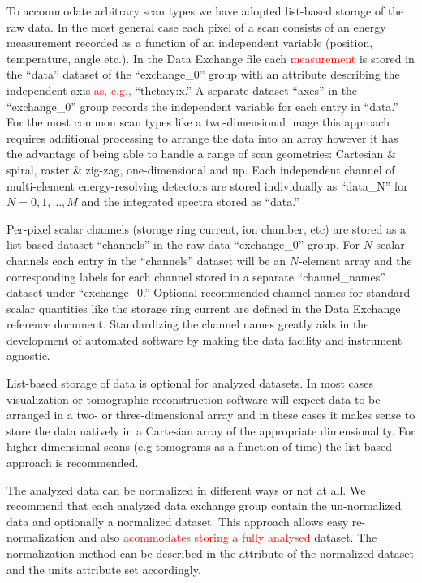 \documentclass[pdf]{iucr}              %
\begin{document}
To accommodate arbitrary scan types we have adopted list-based storage of the raw data. In the most general case each pixel of a scan consists of an energy measurement recorded as a function of an independent variable (position, temperature, angle etc.). In the Data Exchange file each \textcolor{red}{measurement} is stored in the ``data'' dataset of the ``exchange\_0'' group with an attribute describing the independent axis \textcolor{red}{as, e.g.,} ``theta:y:x.'' A separate dataset ``axes'' in the ``exchange\_0'' group records the independent variable for each entry in ``data.'' For the most common scan types like a two-dimensional image this approach requires additional processing to arrange the data into an array however it has the advantage of being able to handle a range of scan geometries: Cartesian \& spiral, raster \& zig-zag, one-dimensional and up. Each independent channel of multi-element energy-resolving detectors are stored individually as ``data\_N'' for $N=0,1,\ldots,M$ and the integrated spectra stored as ``data.''

Per-pixel scalar channels (storage ring current, ion chamber\textcolor{red}{,} etc) are stored as a list-based dataset ``channels'' in the raw data ``exchange\_0'' group. For $N$ scalar channels each entry in the ``channels'' dataset will be an $N$-element array and the corresponding labels for each channel stored in a separate ``channel\_names'' dataset under ``exchange\_0.'' Optional recommended channel names for standard scalar quantities like the storage ring current are defined in the Data Exchange reference document. Standardizing the channel names greatly aids in the development of automated software by making the data facility and instrument agnostic. 

List-based storage of data is optional for analyzed datasets. In most cases visualization or tomographic reconstruction software will expect data to be arranged in a two- or three-dimensional array and in these cases it makes sense to store the data natively in a Cartesian array of the appropriate dimensionality. For higher dimensional scans (e.g tomograms as a function of time) the list-based approach is recommended.

The analyzed data can be normalized in different ways or not at all. We recommend that each analyzed data exchange group contain the un-normalized data and optionally a normalized dataset. This approach allows easy re-normalization and also \textcolor{red}{acommodates storing a fully analysed} dataset. The normalization method can be described in the attribute of the normalized dataset and the units attribute set accordingly.
\end{document}
